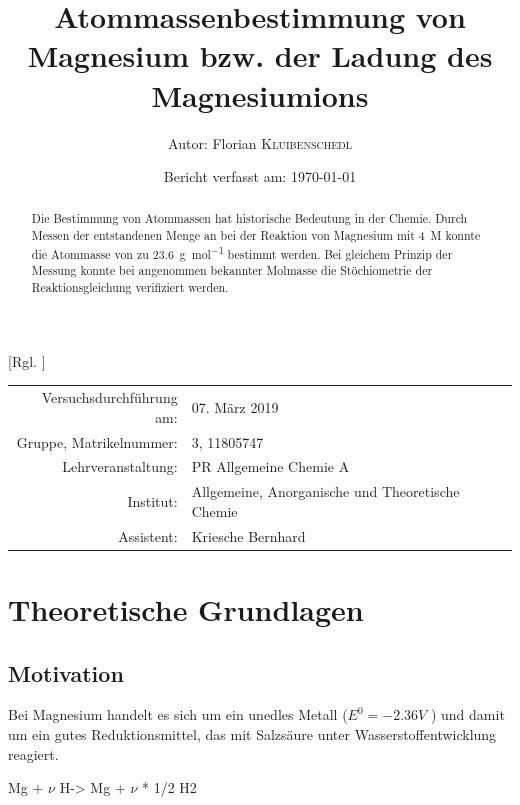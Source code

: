 \documentclass{article}
\title{Atommassenbestimmung von Magnesium bzw. der Ladung des Magnesiumions \cite{Versuchsvorschrift}} %
\author{Autor: Florian \textsc{Kluibenschedl}} %
\date{Bericht verfasst am: \today} %
\begin{document}
  [Rgl. ]{}{}
  
  \maketitle %
  
  \begin{center}
    \begin{tabular}{r p{4cm}}
      Versuchsdurchführung am: & 07. März 2019\\ %
      Gruppe, Matrikelnummer: & 3, 11805747 \\
      Lehrveranstaltung: & PR Allgemeine Chemie A \\
      Institut: & Allgemeine, Anorganische und Theoretische Chemie \\
      Assistent: & Kriesche Bernhard %
    \end{tabular}
  \end{center}


  \begin{abstract}
    Die Bestimmung von Atommassen hat historische Bedeutung in der Chemie. Durch Messen der entstandenen Menge an  bei der Reaktion von Magnesium mit \SI[mode=text]{4}{M}  konnte die Atommasse von  zu \SI[mode=text]{23.6}{\gram\per\mole} bestimmt werden. Bei gleichem Prinzip der Messung konnte bei angenommen bekannter Molmasse die Stöchiometrie der Reaktionsgleichung verifiziert werden.
  \end{abstract}
  
  \pagebreak 
  
  \section{Theoretische Grundlagen}
  
    \subsection{Motivation} \label{sec:Motivation}
  Bei Magnesium handelt es sich um ein unedles Metall ($E^{0} = -2.36 V$ \cite[S. 881]{PhysicalChemistryAtkings}) und damit um ein gutes Reduktionsmittel, das mit Salzsäure unter Wasserstoffentwicklung reagiert.   

  \begin{reaction}
    Mg\sld{} + $\nu$ H\pch\aq -> Mg\pch[$\nu$] \aq{} + $\nu$ * 1/2 H2\gas{} \label{rec:MagnesiumWasserstoffAllgemein}
  \end{reaction}
  
\end{document}
